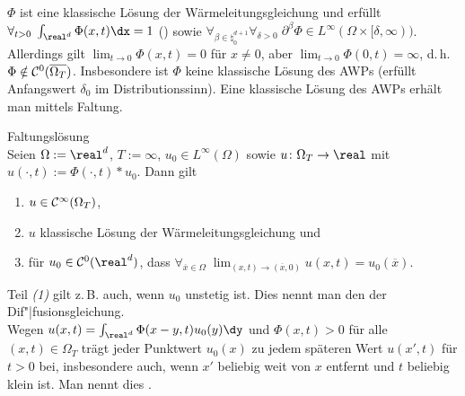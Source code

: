 \begin{Bem}
    $\Phi$ ist eine klassische Lösung der Wärmeleitungsgleichung und erfüllt\\
    $\forall_{t > 0}\; \int_{\real^d} \Phi(x, t) \dx = 1$ () sowie
    $\forall_{\beta \in \natural_0^{d+1}} \forall_{\delta > 0}\;
    \partial^\beta \Phi \in L^\infty(\Omega \times [\delta, \infty))$.\\
    Allerdings gilt $\lim_{t \to 0} \Phi(x, t) = 0$ für $x \not= 0$, aber
    $\lim_{t \to 0} \Phi(0, t) = \infty$, d.\,h. $\Phi \notin \mathcal{C}^0(\overline{\Omega_T})$.
    Insbesondere ist $\Phi$ keine klassische Lösung des AWPs
    (erfüllt Anfangswert $\delta_0$ im Distributionssinn).
    Eine klassische Lösung des AWPs erhält man mittels Faltung.
\end{Bem}

\begin{Satz}{Faltungslösung}\\
    Seien $\Omega := \real^d$, $T := \infty$,
    $u_0 \in L^\infty(\Omega)$ sowie $u\colon \Omega_T \to \real$ mit
    $u(\cdot, t) := \Phi(\cdot, t) \ast u_0$.
    Dann gilt
    \begin{enumerate}
        \item
        $u \in \mathcal{C}^\infty(\Omega_T)$,
        
        \item
        $u$ klassische Lösung der Wärmeleitungsgleichung und
        
        \item
        für $u_0 \in \C^0(\real^d)$, dass $\forall_{\overline{x} \in \Omega}\;
        \lim_{(x, t) \to (\overline{x}, 0)} u(x, t) = u_0(\overline{x})$.
    \end{enumerate}
\end{Satz}

\begin{Bem}
    Teil \emph{(1)} gilt z.\,B. auch, wenn $u_0$ unstetig ist.
    Dies nennt man den  der
    Dif"|fusionsgleichung.\\
    Wegen $u(x, t) = \int_{\real^d} \Phi(x - y, t) u_0(y) \dy$ und $\Phi(x, t) > 0$ für alle
    $(x, t) \in \Omega_T$ trägt jeder Punktwert $u_0(x)$ zu jedem späteren Wert $u(x', t)$
    für $t > 0$ bei,
    insbesondere auch, wenn $x'$ beliebig weit von $x$ entfernt und $t$ beliebig klein ist.
    Man nennt dies .
\end{Bem}

